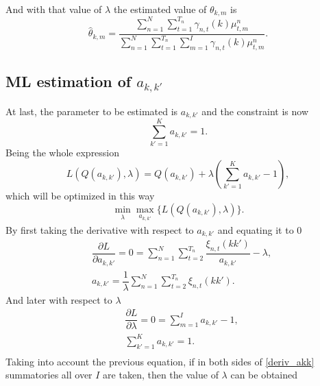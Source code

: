 \documentclass[12pt]{article}%
\begin{document}
And with that value of $\lambda$ the estimated value of $\theta_{k,m}$ is
\begin{equation}
\widehat{\theta}_{k,m} = \dfrac{\sum \limits_{n=1}^{N} \sum \limits_ { t = 1 } ^ { T _ { n } }\gamma_{n,t}(k)\mu_{t,m}^{n}}{\sum \limits_{n=1}^{N}\sum \limits_ { t = 1 } ^ { T _ { n } }\sum \limits_{m=1}^{I}\gamma_{n,t}(k)\mu_{t,m}^{n}}.
\end{equation}
\subsection{ML estimation of $a_{k,k'}$}
At last, the parameter to be estimated is $a_{k,k'}$ and the constraint is now
\begin{equation}
\label{constraint_akk}
\sum \limits_{k'=1}^{K} a_{k,k'} = 1.
\end{equation}
Being the whole expression
\begin{equation}
\label{lagrange_akk}
L\left( Q(a_{k,k'}),\lambda \right) = Q(a_{k,k'}) + \lambda \left( \sum \limits_{k'=1}^{K} a_{k,k'} - 1 \right),
\end{equation}
which will be optimized in this way
\begin{equation}
\label{minmax_lagrange_akk}
\min_{\substack{\lambda}} \max_{\substack{a_{k,k'}}} \lbrace L\left( Q(a_{k,k'}),\lambda \right) \rbrace.
\end{equation}
By first taking the derivative with respect to $a_{k,k'}$ and equating it to 0
\begin{equation}
\label{deriv_akk}
\begin{split}
& \dfrac{\partial L}{\partial a_{k,k'}} = 0 = \sum \limits_{n=1}^{N}\sum _ { t = 2 } ^ { T _ { n } } \dfrac{\xi_{n,t}(kk')}{a_{k,k'}} - \lambda, \\
& a_{k,k'} = \dfrac{1}{\lambda} \sum \limits_{n=1}^{N} \sum _ { t = 2 } ^ { T _ { n } }\xi_{n,t}(kk').
\end{split}
\end{equation}
And later with respect to $\lambda$
\begin{equation}
\begin{split}
& \dfrac{\partial L}{\partial \lambda} = 0 = \sum \limits_{m=1}^{I} a_{k,k'} - 1,\\
& \sum \limits_{k'=1}^{K} a_{k,k'} = 1.\\
\end{split}
\end{equation}
Taking into account the previous equation, if in both sides of \eqref{deriv_akk} summatories all over $I$ are taken, then the value of $\lambda$ can be obtained
\end{document}
